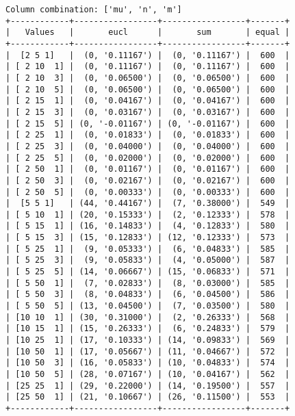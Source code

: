 \documentclass{article}
\begin{document}
\begin{verbatim}
Column combination: ['mu', 'n', 'm']
+------------+-----------------+-----------------+-------+
|   Values   |       eucl      |       sum       | equal |
+------------+-----------------+-----------------+-------+
|  [2 5 1]   |  (0, '0.11167') |  (0, '0.11167') |  600  |
| [ 2 10  1] |  (0, '0.11167') |  (0, '0.11167') |  600  |
| [ 2 10  3] |  (0, '0.06500') |  (0, '0.06500') |  600  |
| [ 2 10  5] |  (0, '0.06500') |  (0, '0.06500') |  600  |
| [ 2 15  1] |  (0, '0.04167') |  (0, '0.04167') |  600  |
| [ 2 15  3] |  (0, '0.03167') |  (0, '0.03167') |  600  |
| [ 2 15  5] | (0, '-0.01167') | (0, '-0.01167') |  600  |
| [ 2 25  1] |  (0, '0.01833') |  (0, '0.01833') |  600  |
| [ 2 25  3] |  (0, '0.04000') |  (0, '0.04000') |  600  |
| [ 2 25  5] |  (0, '0.02000') |  (0, '0.02000') |  600  |
| [ 2 50  1] |  (0, '0.01167') |  (0, '0.01167') |  600  |
| [ 2 50  3] |  (0, '0.02167') |  (0, '0.02167') |  600  |
| [ 2 50  5] |  (0, '0.00333') |  (0, '0.00333') |  600  |
|  [5 5 1]   | (44, '0.44167') |  (7, '0.38000') |  549  |
| [ 5 10  1] | (20, '0.15333') |  (2, '0.12333') |  578  |
| [ 5 15  1] | (16, '0.14833') |  (4, '0.12833') |  580  |
| [ 5 15  3] | (15, '0.12833') | (12, '0.12333') |  573  |
| [ 5 25  1] |  (9, '0.05333') |  (6, '0.04833') |  585  |
| [ 5 25  3] |  (9, '0.05833') |  (4, '0.05000') |  587  |
| [ 5 25  5] | (14, '0.06667') | (15, '0.06833') |  571  |
| [ 5 50  1] |  (7, '0.02833') |  (8, '0.03000') |  585  |
| [ 5 50  3] |  (8, '0.04833') |  (6, '0.04500') |  586  |
| [ 5 50  5] | (13, '0.04500') |  (7, '0.03500') |  580  |
| [10 10  1] | (30, '0.31000') |  (2, '0.26333') |  568  |
| [10 15  1] | (15, '0.26333') |  (6, '0.24833') |  579  |
| [10 25  1] | (17, '0.10333') | (14, '0.09833') |  569  |
| [10 50  1] | (17, '0.05667') | (11, '0.04667') |  572  |
| [10 50  3] | (16, '0.05833') | (10, '0.04833') |  574  |
| [10 50  5] | (28, '0.07167') | (10, '0.04167') |  562  |
| [25 25  1] | (29, '0.22000') | (14, '0.19500') |  557  |
| [25 50  1] | (21, '0.10667') | (26, '0.11500') |  553  |
+------------+-----------------+-----------------+-------+
\end{verbatim}
\end{document}
